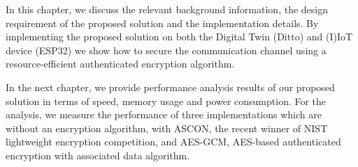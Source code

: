  
In this chapter, we discuss the relevant background information, the design requirement of the proposed solution and the implementation details. By implementing the proposed solution on both the Digital Twin (Ditto) and (I)IoT device (ESP32) we show how to secure the communication channel using a resource-efficient authenticated encryption algorithm. 

In the next chapter, we provide performance analysis results of our proposed solution in terms of speed, memory usage and power consumption. For the analysis, we measure the performance of three implementations which are without an encryption algorithm, with ASCON, the recent winner of NIST lightweight encryption competition, and AES-GCM, AES-based authenticated encryption with associated data algorithm. 